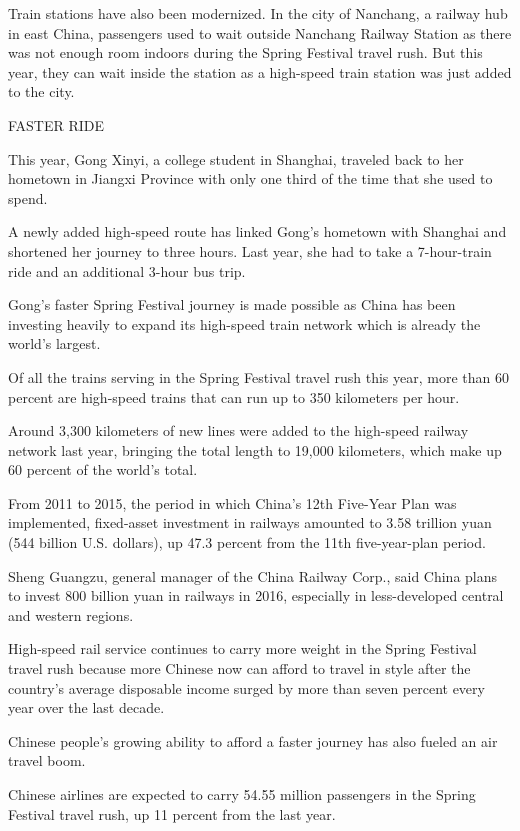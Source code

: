 \begin{displayquote}
	Train stations have also been modernized. In the city of Nanchang, a railway
	hub in east China, passengers used to wait outside Nanchang Railway Station as
	there was not enough room indoors during the Spring Festival travel rush. But
	this year, they can wait inside the station as a high-speed train station was
	just added to the city.

	FASTER RIDE

	This year, Gong Xinyi, a college student in Shanghai, traveled back to her
	hometown in Jiangxi Province with only one third of the time that she used to
	spend.

	A newly added high-speed route has linked Gong's hometown with Shanghai and
	shortened her journey to three hours. Last year, she had to take a
	7-hour-train ride and an additional 3-hour bus trip.

	Gong's faster Spring Festival journey is made possible as China has been
	investing heavily to expand its high-speed train network which is already the
	world's largest.

	Of all the trains serving in the Spring Festival travel rush this year, more
	than 60 percent are high-speed trains that can run up to 350 kilometers per
	hour.

	Around 3,300 kilometers of new lines were added to the high-speed railway
	network last year, bringing the total length to 19,000 kilometers, which make
	up 60 percent of the world's total.

	From 2011 to 2015, the period in which China's 12th Five-Year Plan was
	implemented, fixed-asset investment in railways amounted to 3.58 trillion yuan
	(544 billion U.S. dollars), up 47.3 percent from the 11th five-year-plan
	period.

	Sheng Guangzu, general manager of the China Railway Corp., said China plans to
	invest 800 billion yuan in railways in 2016, especially in less-developed
	central and western regions.

	High-speed rail service continues to carry more weight in the Spring Festival
	travel rush because more Chinese now can afford to travel in style after the
	country's average disposable income surged by more than seven percent every
	year over the last decade.

	Chinese people's growing ability to afford a faster journey has also fueled an
	air travel boom.

	Chinese airlines are expected to carry 54.55 million passengers in the Spring
	Festival travel rush, up 11 percent from the last year.


\end{displayquote}
